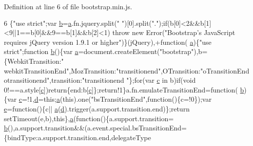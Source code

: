 Definition at line 6 of file bootstrap.\+min.\+js.


\begin{DoxyCode}
6 \{\textcolor{stringliteral}{"use strict"};var \hyperlink{a00029_ac0431efac4d7c393d1e70b86115cb93f}{b}=\hyperlink{a00029_ae8f6b400ed3390908c5cdeebed3a82b9}{a}.fn.jquery.split(\textcolor{stringliteral}{" "})[0].split(\textcolor{stringliteral}{"."});\textcolor{keywordflow}{if}(b[0]<2&&b[1]<9||1==b[0]&&9==b[1]&&b[2]<1)\textcolor{keywordflow}{
      throw} \textcolor{keyword}{new} Error(\textcolor{stringliteral}{"Bootstrap's JavaScript requires jQuery version 1.9.1 or higher"})\}(jQuery),+\textcolor{keyword}{function}(
      \hyperlink{a00029_ae8f6b400ed3390908c5cdeebed3a82b9}{a})\{\textcolor{stringliteral}{"use strict"};\textcolor{keyword}{function} \hyperlink{a00029_ac0431efac4d7c393d1e70b86115cb93f}{b}()\{var \hyperlink{a00029_ae8f6b400ed3390908c5cdeebed3a82b9}{a}=document.createElement(\textcolor{stringliteral}{"bootstrap"}),b=\{WebkitTransition:\textcolor{stringliteral}{"
      webkitTransitionEnd"},MozTransition:\textcolor{stringliteral}{"transitionend"},OTransition:\textcolor{stringliteral}{"oTransitionEnd otransitionend"},transition:\textcolor{stringliteral}{"transitionend
      "}\};\textcolor{keywordflow}{for}(var \hyperlink{a00029_ad9d1ac02e33c4aed62ad517a7cb8b3fb}{c} in b)\textcolor{keywordflow}{if}(\textcolor{keywordtype}{void} 0!==a.style[\hyperlink{a00029_ad9d1ac02e33c4aed62ad517a7cb8b3fb}{c}])\textcolor{keywordflow}{return}\{end:b[\hyperlink{a00029_ad9d1ac02e33c4aed62ad517a7cb8b3fb}{c}]\};\textcolor{keywordflow}{return}!1\}a.fn.emulateTransitionEnd=\textcolor{keyword}{function}(
      \hyperlink{a00029_ac0431efac4d7c393d1e70b86115cb93f}{b})\{var \hyperlink{a00029_ad9d1ac02e33c4aed62ad517a7cb8b3fb}{c}=!1,\hyperlink{a00029_aeb337d295abaddb5ec3cb34cc2e2bbc9}{d}=\textcolor{keyword}{this};\hyperlink{a00029_ae8f6b400ed3390908c5cdeebed3a82b9}{a}(\textcolor{keyword}{this}).one(\textcolor{stringliteral}{"bsTransitionEnd"},\textcolor{keyword}{function}()\{c=!0\});var \hyperlink{a00029_ab5902775854a8b8440bcd25e0fe1c120}{e}=\textcolor{keyword}{function}()\{c||
      \hyperlink{a00029_ae8f6b400ed3390908c5cdeebed3a82b9}{a}(\hyperlink{a00029_aeb337d295abaddb5ec3cb34cc2e2bbc9}{d}).trigger(a.support.transition.end)\};\textcolor{keywordflow}{return} setTimeout(e,b),\textcolor{keyword}{this}\},\hyperlink{a00029_ae8f6b400ed3390908c5cdeebed3a82b9}{a}(\textcolor{keyword}{function}()\{a.support.transition=
      \hyperlink{a00029_ac0431efac4d7c393d1e70b86115cb93f}{b}(),a.support.transition&&(a.event.special.bsTransitionEnd=\{bindType:a.support.transition.end,delegateType

\end{DoxyCode}
